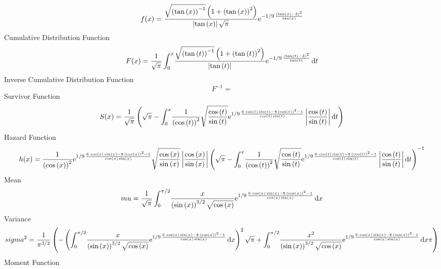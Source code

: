 \documentclass[12pt]{article}
\begin{document}
$$  f(x)={\frac {\sqrt { \left( \tan \left( x \right)  \right) ^{-1}} \left( 1+
 \left( \tan \left( x \right)  \right) ^{2} \right) }{ \left| \tan
 \left( x \right)  \right| \sqrt {\pi}}{{\rm e}^{-1/9\,{\frac {
 \left( \tan \left( x \right) -3 \right) ^{2}}{\tan \left( x \right) }
}}}}
$$Cumulative Distribution Function  
 $$F(x)={\frac {1}{\sqrt {\pi}}\int_{0}^{x}\!{\frac {\sqrt { \left( \tan
 \left( t \right)  \right) ^{-1}} \left( 1+ \left( \tan \left( t
 \right)  \right) ^{2} \right) }{ \left| \tan \left( t \right) 
 \right| }{{\rm e}^{-1/9\,{\frac { \left( \tan \left( t \right) -3
 \right) ^{2}}{\tan \left( t \right) }}}}}\,{\rm d}t}
$$ Inverse Cumulative Distribution Function 
  $$F^{-1} = $$Survivor Function 
 $$ S(x)={\frac {1}{\sqrt {\pi}} \left( \sqrt {\pi}-\int_{0}^{x}\!{\frac {1}{
 \left( \cos \left( t \right)  \right) ^{2}}\sqrt {{\frac {\cos
 \left( t \right) }{\sin \left( t \right) }}}{{\rm e}^{1/9\,{\frac {6
\,\cos \left( t \right) \sin \left( t \right) -8\, \left( \cos \left( 
t \right)  \right) ^{2}-1}{\cos \left( t \right) \sin \left( t
 \right) }}}} \left| {\frac {\cos \left( t \right) }{\sin \left( t
 \right) }} \right| }\,{\rm d}t \right) }
$$ Hazard Function 
 $$ h(x)={\frac {1}{ \left( \cos \left( x \right)  \right) ^{2}}{{\rm e}^{1/9\,
{\frac {6\,\cos \left( x \right) \sin \left( x \right) -8\, \left( 
\cos \left( x \right)  \right) ^{2}-1}{\cos \left( x \right) \sin
 \left( x \right) }}}}\sqrt {{\frac {\cos \left( x \right) }{\sin
 \left( x \right) }}} \left| {\frac {\cos \left( x \right) }{\sin
 \left( x \right) }} \right|  \left( \sqrt {\pi}-\int_{0}^{x}\!{\frac 
{1}{ \left( \cos \left( t \right)  \right) ^{2}}\sqrt {{\frac {\cos
 \left( t \right) }{\sin \left( t \right) }}}{{\rm e}^{1/9\,{\frac {6
\,\cos \left( t \right) \sin \left( t \right) -8\, \left( \cos \left( 
t \right)  \right) ^{2}-1}{\cos \left( t \right) \sin \left( t
 \right) }}}} \left| {\frac {\cos \left( t \right) }{\sin \left( t
 \right) }} \right| }\,{\rm d}t \right) ^{-1}}
$$Mean 
 $$ mu={\frac {1}{\sqrt {\pi}}\int_{0}^{\pi/2}\!{\frac {x}{ \left( \sin
 \left( x \right)  \right) ^{3/2}\sqrt {\cos \left( x \right) }}{
{\rm e}^{1/9\,{\frac {6\,\cos \left( x \right) \sin \left( x \right) -
8\, \left( \cos \left( x \right)  \right) ^{2}-1}{\cos \left( x
 \right) \sin \left( x \right) }}}}}\,{\rm d}x}
$$ Variance 
 $$ sigma^2 = {\frac {1}{{\pi}^{3/2}} \left( - \left( \int_{0}^{\pi/2}\!{\frac {x}{
 \left( \sin \left( x \right)  \right) ^{3/2}\sqrt {\cos \left( x
 \right) }}{{\rm e}^{1/9\,{\frac {6\,\cos \left( x \right) \sin
 \left( x \right) -8\, \left( \cos \left( x \right)  \right) ^{2}-1}{
\cos \left( x \right) \sin \left( x \right) }}}}}\,{\rm d}x \right) ^{
2}\sqrt {\pi}+\int_{0}^{\pi/2}\!{\frac {{x}^{2}}{ \left( \sin \left( x
 \right)  \right) ^{3/2}\sqrt {\cos \left( x \right) }}{{\rm e}^{1/9\,
{\frac {6\,\cos \left( x \right) \sin \left( x \right) -8\, \left( 
\cos \left( x \right)  \right) ^{2}-1}{\cos \left( x \right) \sin
 \left( x \right) }}}}}\,{\rm d}x\pi \right) }
$$Moment Function 
\end{document}
